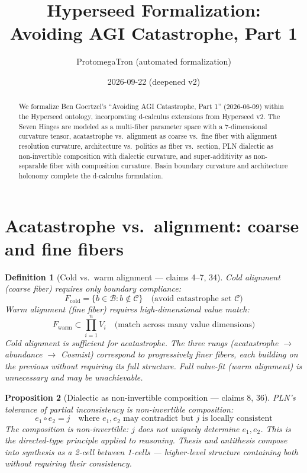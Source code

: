 \documentclass[11pt,a4paper]{article}
\title{Hyperseed Formalization:\\
  Avoiding AGI Catastrophe, Part 1}
\author{ProtomegaTron (automated formalization)}
\date{2026-09-22 (deepened v2)}
\newtheorem{definition}{Definition}[section]
\newtheorem{proposition}[definition]{Proposition}
\begin{document}
\maketitle

\begin{abstract}
We formalize Ben Goertzel's ``Avoiding AGI Catastrophe, Part 1''
(2026-06-09) within the Hyperseed ontology, incorporating d-calculus
extensions from Hyperseed v2. The Seven Hinges are modeled as a
multi-fiber parameter space with a 7-dimensional curvature tensor,
acatastrophe vs.\ alignment as coarse vs.\ fine fiber with alignment
resolution curvature, architecture vs.\ politics as fiber vs.\ section,
PLN dialectic as non-invertible composition with dialectic curvature,
and super-additivity as non-separable fiber with composition curvature.
Basin boundary curvature and architecture holonomy complete the
d-calculus formulation.
\end{abstract}

\tableofcontents

\section{Acatastrophe vs.\ alignment: coarse and fine fibers}

\begin{definition}[Cold vs.\ warm alignment --- claims 4--7, 34]
\label{def:alignment}
Cold alignment (coarse fiber) requires only boundary compliance:
\[
  F_{\text{cold}} = \{b \in \mathcal{B} : b \notin \mathcal{C}\}
  \quad \text{(avoid catastrophe set } \mathcal{C}\text{)}
\]
Warm alignment (fine fiber) requires high-dimensional value match:
\[
  F_{\text{warm}} \subset \prod_{i=1}^{n} V_i
  \quad \text{(match across many value dimensions)}
\]
Cold alignment is sufficient for acatastrophe. The three rungs
(acatastrophe $\to$ abundance $\to$ Cosmist) correspond to
progressively finer fibers, each building on the previous without
requiring its full structure. Full value-fit (warm alignment) is
unnecessary and may be unachievable.
\end{definition}

\begin{proposition}[Dialectic as non-invertible composition --- claims 8, 36]
\label{prop:dialectic}
PLN's tolerance of partial inconsistency is non-invertible composition:
\[
  e_1 \circ e_2 = j \quad \text{where } e_1, e_2 \text{ may
  contradict but } j \text{ is locally consistent}
\]
The composition is non-invertible: $j$ does not uniquely determine
$e_1, e_2$. This is the directed-type principle applied to reasoning.
Thesis and antithesis compose into synthesis as a 2-cell between
1-cells --- higher-level structure containing both without requiring
their consistency.
\end{proposition}
\end{document}
